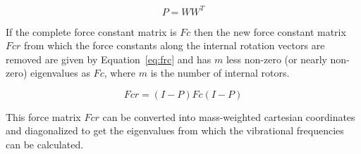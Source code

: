 \documentclass[a4paper,12pt]{article}
\begin{document}
\begin{equation}
 P = WW^T
\label{eq:pr}
\end{equation}

If the complete force constant matrix is $Fc$ then the new force constant matrix $Fcr$ from which the force constants along the internal rotation vectors are removed are given by Equation~\ref{eq:frc} and has $m$ less non-zero (or nearly non-zero) eigenvalues as $Fc$, where $m$ is the number of internal rotors.

\begin{equation}
 Fcr = (I-P)Fc(I-P)
\label{eq:frc}
\end{equation}

This force matrix $Fcr$ can be converted into mass-weighted cartesian coordinates and diagonalized to get the eigenvalues from which the vibrational frequencies can be calculated.
\end{document}
